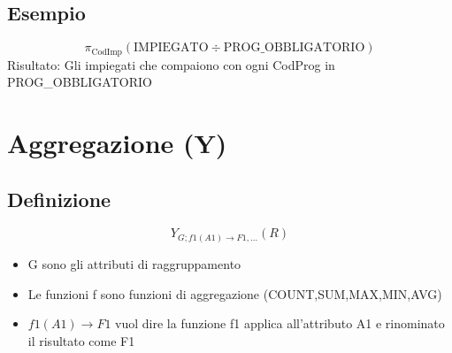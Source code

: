 \subsection{Esempio}
$$
    \pi_{\text{CodImp}}(\text{IMPIEGATO} \div \text{PROG\_OBBLIGATORIO})
$$
Risultato: Gli impiegati che compaiono con ogni CodProg in PROG\_OBBLIGATORIO

\section{Aggregazione (Y)}
\subsection{Definizione}
$$
    Y_{G;f1(A1) \to F1,\dots}(R)
$$
\begin{itemize}
    \item G sono gli attributi di raggruppamento
    \item Le funzioni f sono funzioni di aggregazione (COUNT,SUM,MAX,MIN,AVG)
    \item $f1(A1) \to F1$ vuol dire la funzione f1 applica all'attributo A1 e rinominato il risultato come F1
\end{itemize}

